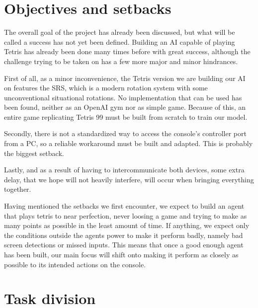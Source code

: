 
\section{Objectives and setbacks}

The overall goal of the project has already been discussed, but what will be called a success has not yet been defined.
Building an AI capable of playing Tetris has already been done many times before with great success, although the challenge trying to be taken on has a few more major and minor hindrances.

First of all, as a minor inconvenience, the Tetris version we are building our AI on features the \ac{SRS}, which is a modern rotation system with some unconventional situational rotations. No implementation that can be used has been found, neither as an OpenAI gym nor as simple game. Because of this, an entire game replicating Tetris 99 must be built from scratch to train our model.

Secondly, there is not a standardized way to access the console’s controller port from a PC, so a reliable workaround must be built and adapted. This is probably the biggest setback.

Lastly, and as a result of having to intercommunicate both devices, some extra delay, that we hope will not heavily interfere, will occur when bringing everything together.

Having mentioned the setbacks we first encounter, we expect to build an agent that plays tetris to near perfection, never loosing a game and trying to make as many points as possible in the least amount of time. If anything, we expect only the conditions outside the agents power to make it perform badly, namely bad screen detections or missed inputs. This means that once a good enough agent has been built, our main focus will shift onto making it perform as closely as possible to its intended actions on the console. 

\section{Task division}

